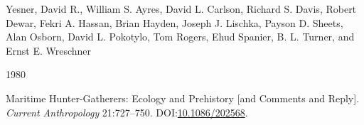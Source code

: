 \documentclass[
  a4paper,
  oneside]{uiophdthesis}
\newlength{\cslhangindent}
\newlength{\csllabelwidth}
\newlength{\cslentryspacingunit} %
\newenvironment{CSLReferences}[2] %
 {%
  \setlength{\parindent}{0pt}
  \ifodd #1
  \let\oldpar\par
  \def\par{\hangindent=\cslhangindent\oldpar}
  \fi
  \setlength{\parskip}{#2\cslentryspacingunit}
 }%
 {}
\newcommand{\CSLBlock}[1]{#1\hfill\break}
\newcommand{\CSLLeftMargin}[1]{\parbox[t]{\csllabelwidth}{#1}}
\newcommand{\CSLRightInline}[1]{\parbox[t]{\linewidth - \csllabelwidth}{#1}\break}
\begin{document}
\begin{CSLReferences}{0}{0}
\leavevmode{}%
\CSLBlock{Yesner, David R., William S. Ayres, David L. Carlson, Richard S. Davis, Robert Dewar, Fekri A. Hassan, Brian Hayden, Joseph J. Lischka, Payson D. Sheets, Alan Osborn, David L. Pokotylo, Tom Rogers, Ehud Spanier, B. L. Turner, and Ernst E. Wreschner}
\CSLLeftMargin{ 1980}
\CSLRightInline{{Maritime Hunter-Gatherers: Ecology and Prehistory {[}and Comments and Reply{]}}. \emph{Current Anthropology} 21:727--750. DOI:\href{https://doi.org/10.1086/202568}{10.1086/202568}.}

\end{CSLReferences}
\end{document}
